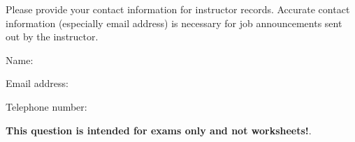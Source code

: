 

Please provide your contact information for instructor records.  Accurate contact information (especially email address) is necessary for job announcements sent out by the instructor.

\vskip 30pt

Name: \underbar{\hskip 150pt}

\vskip 20pt

Email address: \underbar{\hskip 150pt}

\vskip 20pt

Telephone number: \underbar{\hskip 150pt}







 






{\bf This question is intended for exams only and not worksheets!}.



